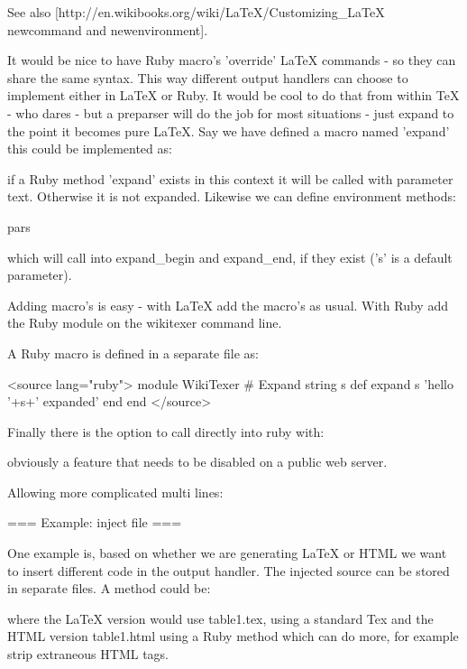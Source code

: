 See also [http://en.wikibooks.org/wiki/LaTeX/Customizing_LaTeX newcommand and newenvironment].

It would be nice to have Ruby macro's 'override' LaTeX commands - so
they can share the same syntax. This way different output handlers can
choose to implement either in LaTeX or Ruby. It would be cool to do
that from within TeX - who dares - but a preparser will do the job for
most situations - just expand to the point it becomes pure LaTeX. Say
we have defined a macro named 'expand' this could be implemented as:


if a Ruby method 'expand' exists in this context it will be called
with parameter text. Otherwise it is not expanded. Likewise we can 
define environment methods:

  \begin{expand}[s]{pars}
	\end{expand}

which will call into expand_begin and expand_end, if they exist ('s'
is a default parameter).

Adding macro's is easy - with LaTeX add the macro's as usual. With
Ruby add the Ruby module on the wikitexer command line.

A Ruby macro is defined in a separate file as:

<source lang="ruby">
  module WikiTexer
		# Expand string s
		def expand s
			'hello '+s+' expanded'
		end
	end
</source>

Finally there is the option to call directly into ruby with:


obviously a feature that needs to be disabled on a public web server.

Allowing more complicated multi lines:



=== Example: inject file ===
  
One example is, based on whether we are generating LaTeX or HTML we
want to insert different code in the output handler. The injected
source can be stored in separate files. A method could be:


where the LaTeX version would use table1.tex, using a standard Tex
 and the HTML version table1.html using a Ruby method
which can do more, for example strip extraneous HTML tags.

